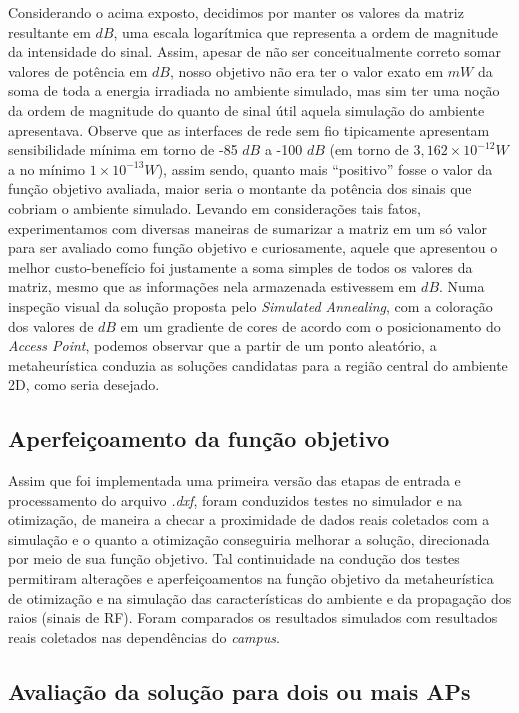 \documentclass[
	12pt,				%
	twoside,			%
	a4paper,			%
	english,			%
	french,				%
	spanish,			%
	brazil				%
	]{abntex2}
\begin{document}
Considerando o acima exposto, decidimos por manter os valores da matriz
resultante em \(dB\), uma escala logarítmica que representa a ordem de
magnitude da intensidade do sinal. Assim, apesar de não ser
conceitualmente correto somar valores de potência em \(dB\), nosso
objetivo não era ter o valor exato em \(mW\) da soma de toda a energia
irradiada no ambiente simulado, mas sim ter uma noção da ordem de
magnitude do quanto de sinal útil aquela simulação do ambiente
apresentava. Observe que as interfaces de rede sem fio tipicamente
apresentam sensibilidade mínima em torno de -85 \(dB\) a -100 \(dB\) (em
torno de \(3,162\times10^{-12} W\) a no mínimo \(1\times10^{-13} W\)),
assim sendo, quanto mais ``positivo'' fosse o valor da função objetivo
avaliada, maior seria o montante da potência dos sinais que cobriam o
ambiente simulado. Levando em considerações tais fatos, experimentamos
com diversas maneiras de sumarizar a matriz em um só valor para ser
avaliado como função objetivo e curiosamente, aquele que apresentou o
melhor custo-benefício foi justamente a soma simples de todos os valores
da matriz, mesmo que as informações nela armazenada estivessem em
\(dB\). Numa inspeção visual da solução proposta pelo \emph{Simulated
Annealing}, com a coloração dos valores de \(dB\) em um gradiente de
cores de acordo com o posicionamento do \emph{Access Point}, podemos
observar que a partir de um ponto aleatório, a metaheurística conduzia
as soluções candidatas para a região central do ambiente 2D, como seria
desejado.

\subsection{Aperfeiçoamento da função
objetivo}\label{aperfeiuxe7oamento-da-funuxe7uxe3o-objetivo}

Assim que foi implementada uma primeira versão das etapas de entrada e
processamento do arquivo \emph{.dxf}, foram conduzidos testes no
simulador e na otimização, de maneira a checar a proximidade de dados
reais coletados com a simulação e o quanto a otimização conseguiria
melhorar a solução, direcionada por meio de sua função objetivo. Tal
continuidade na condução dos testes permitiram alterações e
aperfeiçoamentos na função objetivo da metaheurística de otimização e na
simulação das características do ambiente e da propagação dos raios
(sinais de RF). Foram comparados os resultados simulados com resultados
reais coletados nas dependências do \emph{campus}.

\subsection{Avaliação da solução para dois ou mais
APs}\label{sec:avalia_dois_ou_mais}
\end{document}

